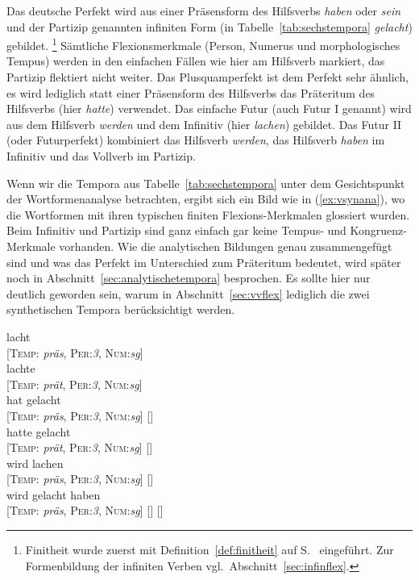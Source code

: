 
Das deutsche Perfekt wird aus einer Präsensform des Hilfsverbs \textit{haben} oder \textit{sein} und der Partizip genannten infiniten Form (in Tabelle~\ref{tab:sechstempora} \textit{gelacht}) gebildet.%
\footnote{Finitheit wurde zuerst mit Definition~\ref{def:finitheit} auf S.~\pageref{def:finitheit} eingeführt.
Zur Formenbildung der infiniten Verben vgl.\ Abschnitt~\ref{sec:infinflex}.}
Sämtliche Flexionsmerkmale (Person, Numerus und morphologisches Tempus) werden in den einfachen Fällen wie hier am Hilfsverb markiert, das Partizip flektiert nicht weiter.
Das Plusquamperfekt ist dem Perfekt sehr ähnlich, es wird lediglich statt einer Präsensform des Hilfsverbs das Präteritum des Hilfsverbs (hier \textit{hatte}) verwendet.
Das einfache Futur (auch Futur I genannt) wird aus dem Hilfsverb \textit{werden} und dem Infinitiv (hier \textit{lachen}) gebildet.
Das Futur II (oder Futurperfekt) kombiniert das Hilfsverb \textit{werden}, das Hilfsverb \textit{haben} im Infinitiv und das Vollverb im Partizip.

Wenn wir die Tempora aus Tabelle~\ref{tab:sechstempora} unter dem Gesichtspunkt der Wortformenanalyse betrachten, ergibt sich ein Bild wie in (\ref{ex:vsynana}), wo die Wortformen mit ihren typischen finiten Flexions-Merkmalen glossiert wurden.
Beim Infinitiv und Partizip sind ganz einfach gar keine Tempus- und Kongruenz-Merkmale vorhanden.
Wie die analytischen Bildungen genau zusammengefügt sind und was \zB das Perfekt im Unterschied zum Präteritum bedeutet, wird später noch in Abschnitt~\ref{sec:analytischetempora} besprochen.
Es sollte hier nur deutlich geworden sein, warum in Abschnitt~\ref{sec:vvflex} lediglich die zwei synthetischen Tempora berücksichtigt werden.

\begin{exe}
  \ex\label{ex:vsynana}
  \begin{xlist}
    \ex\gll lacht \\
    {[\textsc{Temp}: \textit{präs}, \textsc{Per}:\textit{3}, \textsc{Num}:\textit{sg}]}\\
    \ex\gll lachte \\
    {[\textsc{Temp}: \textit{prät}, \textsc{Per}:\textit{3}, \textsc{Num}:\textit{sg}]}\\
    \ex\gll hat gelacht\\
    {[\textsc{Temp}: \textit{präs}, \textsc{Per}:\textit{3}, \textsc{Num}:\textit{sg}]} {[]}\\
    \ex\gll hatte gelacht\\
    {[\textsc{Temp}: \textit{prät}, \textsc{Per}:\textit{3}, \textsc{Num}:\textit{sg}]} {[]}\\
    \ex\gll wird lachen\\
    {[\textsc{Temp}: \textit{präs}, \textsc{Per}:\textit{3}, \textsc{Num}:\textit{sg}]} {[]}\\
    \ex\gll wird gelacht haben \\
    {[\textsc{Temp}: \textit{präs}, \textsc{Per}:\textit{3}, \textsc{Num}:\textit{sg}]} {[]} {[]}\\
  \end{xlist}
\end{exe}


